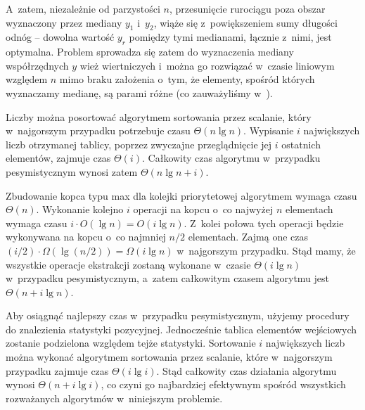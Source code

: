 A~zatem, niezależnie od parzystości $n$, przesunięcie rurociągu poza obszar wyznaczony przez mediany $y_1$ i~$y_2$, wiąże się z~powiększeniem sumy długości odnóg  -- dowolna wartość $y_r$ pomiędzy tymi medianami, łącznie z~nimi, jest optymalna.
Problem sprowadza się zatem do wyznaczenia mediany współrzędnych $y$ wież wiertniczych i~można go rozwiązać w~czasie liniowym względem $n$ mimo braku założenia o~tym, że elementy, spośród których wyznaczamy medianę, są parami różne (co zauważyliśmy w~).

\problems


\subproblem %
Liczby można posortować algorytmem sortowania przez scalanie, który w~najgorszym przypadku potrzebuje czasu $\Theta(n\lg n)$.
Wypisanie $i$ największych liczb otrzymanej tablicy, poprzez zwyczajne przeglądnięcie jej $i$ ostatnich elementów, zajmuje czas $\Theta(i)$.
Całkowity czas algorytmu w~przypadku pesymistycznym wynosi zatem $\Theta(n\lg n+i)$.

\subproblem %
Zbudowanie kopca typu max dla kolejki priorytetowej algorytmem  wymaga czasu $\Theta(n)$.
Wykonanie kolejno $i$ operacji  na kopcu o~co najwyżej $n$ elementach wymaga czasu $i\cdot O(\lg n)=O(i\lg n)$.
Z~kolei połowa tych operacji będzie wykonywana na kopcu o~co najmniej $n/2$ elementach.
Zajmą one czas $(i/2)\cdot\Omega(\lg(n/2))=\Omega(i\lg n)$ w~najgorszym przypadku.
Stąd mamy, że wszystkie operacje ekstrakcji zostaną wykonane w~czasie $\Theta(i\lg n)$ w~przypadku pesymistycznym, a~zatem całkowitym czasem algorytmu jest $\Theta(n+i\lg n)$.

\subproblem %
Aby osiągnąć najlepszy czas w~przypadku pesymistycznym, użyjemy procedury  do znalezienia  statystyki pozycyjnej.
Jednocześnie tablica elementów wejściowych zostanie podzielona względem tejże statystyki.
Sortowanie $i$ największych liczb można wykonać algorytmem sortowania przez scalanie, które w~najgorszym przypadku zajmuje czas $\Theta(i\lg i)$.
Stąd całkowity czas działania algorytmu wynosi $\Theta(n+i\lg i)$, co czyni go najbardziej efektywnym spośród wszystkich rozważanych algorytmów w~niniejszym problemie.


